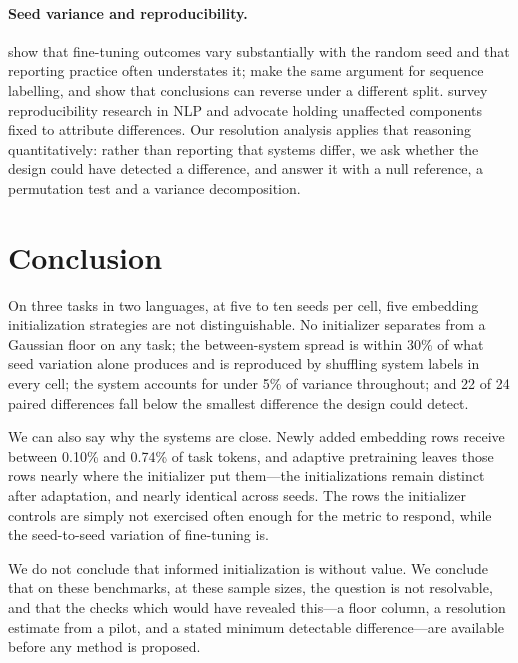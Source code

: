 \documentclass[11pt]{article}
\begin{document}
\paragraph{Seed variance and reproducibility.}
\citet{dodge-etal-2020-fine} show that fine-tuning outcomes vary substantially
with the random seed and that reporting practice often understates it;
\citet{reimers-gurevych-2017-reporting} make the same argument for sequence
labelling, and \citet{gorman-bedrick-2019-need} show that conclusions can
reverse under a different split. \citet{belz-etal-2021-systematic} survey
reproducibility research in NLP and advocate holding unaffected components
fixed to attribute differences. Our resolution analysis applies that
reasoning quantitatively: rather than reporting that systems differ, we ask
whether the design could have detected a difference, and answer it with a
null reference, a permutation test and a variance decomposition.

\section{Conclusion}

On three tasks in two languages, at five to ten seeds per cell, five
embedding initialization strategies are not distinguishable. No initializer
separates from a Gaussian floor on any task; the between-system spread is
within 30\% of what seed variation alone produces and is reproduced by
shuffling system labels in every cell; the system accounts for under 5\% of
variance throughout; and 22 of 24 paired differences fall below the smallest
difference the design could detect.

We can also say why the systems are close. Newly added embedding rows receive
between 0.10\% and 0.74\% of task tokens, and adaptive pretraining leaves
those rows nearly where the initializer put them---the initializations remain
distinct after adaptation, and nearly identical across seeds. The rows the
initializer controls are simply not exercised often enough for the metric to
respond, while the seed-to-seed variation of fine-tuning is.

We do not conclude that informed initialization is without value. We conclude
that on these benchmarks, at these sample sizes, the question is not
resolvable, and that the checks which would have revealed this---a floor
column, a resolution estimate from a pilot, and a stated minimum detectable
difference---are available before any method is proposed.
\end{document}
